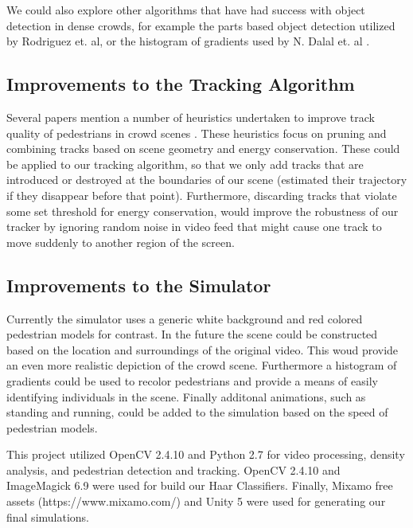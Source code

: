 \documentclass[12pt, onecolumn, conference]{IEEEtran}
\begin{document}
We could also explore other algorithms that have had success with object detection in dense crowds, for example the parts based object detection utilized by Rodriguez et. al, or the histogram of gradients used by N. Dalal et. al \cite{M. Rodriguez}\cite{N. Dalal}.

\subsection{Improvements to the Tracking Algorithm}
Several papers mention a number of heuristics undertaken to improve track quality of pedestrians in crowd scenes \cite{M. Rodriguez}\cite{D. Zhang}. These heuristics focus on pruning and combining tracks based on scene geometry and energy conservation. These could be applied to our tracking algorithm, so that we only add tracks that are introduced or destroyed at the boundaries of our scene (estimated their trajectory if they disappear before that point). Furthermore, discarding tracks that violate some set threshold for energy conservation, would improve the robustness of our tracker by ignoring random noise in video feed that might cause one track to move suddenly to another region of the screen.

\subsection{Improvements to the Simulator}
Currently the simulator uses a generic white background and red colored pedestrian models for contrast. In the future the scene could be constructed based on the location and surroundings of the original video. This woud provide an even more realistic depiction of the crowd scene. Furthermore a histogram of gradients could be used to recolor pedestrians and provide a means of easily identifying individuals in the scene. Finally additonal animations, such as standing and running, could be added to the simulation based on the speed of pedestrian models. 

This project utilized OpenCV 2.4.10 and Python 2.7 for video processing, density analysis, and pedestrian detection and tracking. OpenCV 2.4.10 and ImageMagick 6.9 were used for build our Haar Classifiers. Finally, Mixamo free assets (https://www.mixamo.com/) and Unity 5 were used for generating our final simulations. 
\end{document}
